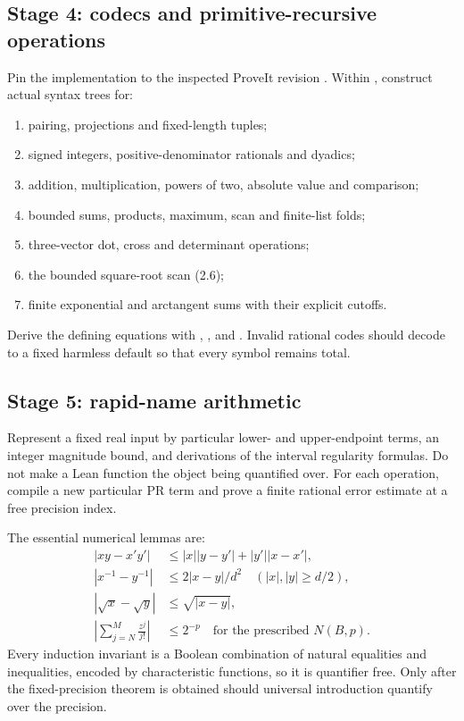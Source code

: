 \subsection{Stage 4: codecs and primitive-recursive operations}

Pin the implementation to the inspected ProveIt revision
.  Within
, construct actual  syntax trees for:
\begin{enumerate}
\item pairing, projections and fixed-length tuples;
\item signed integers, positive-denominator rationals and dyadics;
\item addition, multiplication, powers of two, absolute value and comparison;
\item bounded sums, products, maximum, scan and finite-list folds;
\item three-vector dot, cross and determinant operations;
\item the bounded square-root scan (2.6);
\item finite exponential and arctangent sums with their explicit cutoffs.
\end{enumerate}
Derive the defining equations with , ,
 and .  Invalid rational codes should
decode to a fixed harmless default so that every symbol remains total.

\subsection{Stage 5: rapid-name arithmetic}

Represent a fixed real input by particular lower- and upper-endpoint
 terms, an integer magnitude bound, and derivations of the interval
regularity formulas.  Do not make a Lean function  the object
being quantified over.  For each operation, compile a new particular PR term
and prove a finite rational error estimate at a free precision index.

The essential numerical lemmas are:
\begin{align*}
 |xy-x'y'|&\le |x||y-y'|+|y'||x-x'|,\\
 |x^{-1}-y^{-1}|&\le 2|x-y|/d^2\quad(|x|,|y|\ge d/2),\\
 |\sqrt x-\sqrt y|&\le\sqrt{|x-y|},\\
 \left|\sum_{j=N}^{M}\frac{z^j}{j!}\right|&\le2^{-p}
 \quad\text{for the prescribed }N(B,p).
\end{align*}
Every induction invariant is a Boolean combination of natural equalities and
inequalities, encoded by characteristic functions, so it is quantifier free.
Only after the fixed-precision theorem is obtained should universal
introduction quantify over the precision.

